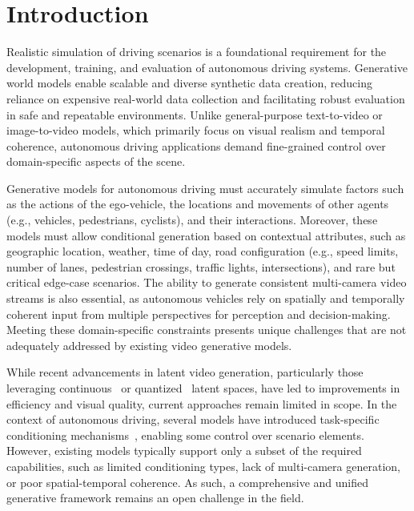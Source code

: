 \section{Introduction}
\label{section:introduction}

Realistic simulation of driving scenarios is a foundational requirement for the development, training, and evaluation of autonomous driving systems. Generative world models enable scalable and diverse synthetic data creation, reducing reliance on expensive real-world data collection and facilitating robust evaluation in safe and repeatable environments. Unlike general-purpose text-to-video or image-to-video models, which primarily focus on visual realism and temporal coherence, autonomous driving applications demand fine-grained control over domain-specific aspects of the scene.

Generative models for autonomous driving must accurately simulate factors such as the actions of the ego-vehicle, the locations and movements of other agents (e.g., vehicles, pedestrians, cyclists), and their interactions. Moreover, these models must allow conditional generation based on contextual attributes, such as geographic location, weather, time of day, road configuration (e.g., speed limits, number of lanes, pedestrian crossings, traffic lights, intersections), and rare but critical edge-case scenarios. The ability to generate consistent multi-camera video streams is also essential, as autonomous vehicles rely on spatially and temporally coherent input from multiple perspectives for perception and decision-making. Meeting these domain-specific constraints presents unique challenges that are not adequately addressed by existing video generative models.

While recent advancements in latent video generation, particularly those leveraging continuous~\cite{kingma14,agarwal2025cosmos} or quantized~\cite{agarwal2025cosmos,oord17,esser21} latent spaces, have led to improvements in efficiency and visual quality, current approaches remain limited in scope. In the context of autonomous driving, several models have introduced task-specific conditioning mechanisms~\cite{gaia1-2023,wang2023drivedreamer,wang2024driving,gao2024vista,zhao2024drivedreamer4d}, enabling some control over scenario elements. However, existing models typically support only a subset of the required capabilities, such as limited conditioning types, lack of multi-camera generation, or poor spatial-temporal coherence. As such, a comprehensive and unified generative framework remains an open challenge in the field.

